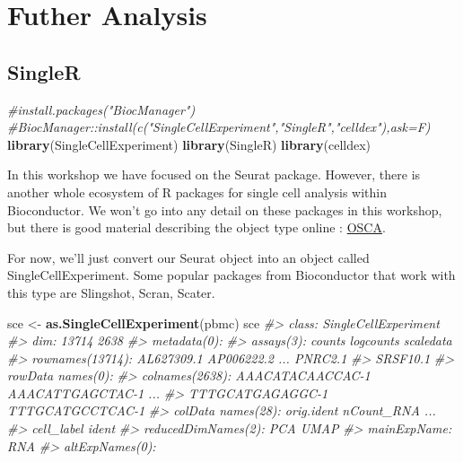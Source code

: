 \documentclass[
]{book}
\newenvironment{Shaded}{\begin{snugshade}}{\end{snugshade}}
\newcommand{\CommentTok}[1]{\textcolor[rgb]{0.56,0.35,0.01}{\textit{#1}}}
\newcommand{\FunctionTok}[1]{\textcolor[rgb]{0.13,0.29,0.53}{\textbf{#1}}}
\newcommand{\NormalTok}[1]{#1}
\newcommand{\OtherTok}[1]{\textcolor[rgb]{0.56,0.35,0.01}{#1}}
\begin{document}
\part{Futher Analysis}\label{part-futher-analysis}

\chapter{SingleR}\label{singler}

\begin{Shaded}
\begin{Highlighting}[]
\CommentTok{\#install.packages("BiocManager")}
\CommentTok{\#BiocManager::install(c("SingleCellExperiment","SingleR","celldex"),ask=F)}
\FunctionTok{library}\NormalTok{(SingleCellExperiment)}
\FunctionTok{library}\NormalTok{(SingleR)}
\FunctionTok{library}\NormalTok{(celldex)}
\end{Highlighting}
\end{Shaded}

In this workshop we have focused on the Seurat package. However, there is another whole ecosystem of R packages for single cell analysis within Bioconductor. We won't go into any detail on these packages in this workshop, but there is good material describing the object type online : \href{https://robertamezquita.github.io/orchestratingSingleCellAnalysis/data-infrastructure.html}{OSCA}.

For now, we'll just convert our Seurat object into an object called SingleCellExperiment. Some popular packages from Bioconductor that work with this type are Slingshot, Scran, Scater.

\begin{Shaded}
\begin{Highlighting}[]
\NormalTok{sce }\OtherTok{\textless{}{-}} \FunctionTok{as.SingleCellExperiment}\NormalTok{(pbmc)}
\NormalTok{sce}
\CommentTok{\#\textgreater{} class: SingleCellExperiment }
\CommentTok{\#\textgreater{} dim: 13714 2638 }
\CommentTok{\#\textgreater{} metadata(0):}
\CommentTok{\#\textgreater{} assays(3): counts logcounts scaledata}
\CommentTok{\#\textgreater{} rownames(13714): AL627309.1 AP006222.2 ... PNRC2.1}
\CommentTok{\#\textgreater{}   SRSF10.1}
\CommentTok{\#\textgreater{} rowData names(0):}
\CommentTok{\#\textgreater{} colnames(2638): AAACATACAACCAC{-}1 AAACATTGAGCTAC{-}1 ...}
\CommentTok{\#\textgreater{}   TTTGCATGAGAGGC{-}1 TTTGCATGCCTCAC{-}1}
\CommentTok{\#\textgreater{} colData names(28): orig.ident nCount\_RNA ...}
\CommentTok{\#\textgreater{}   cell\_label ident}
\CommentTok{\#\textgreater{} reducedDimNames(2): PCA UMAP}
\CommentTok{\#\textgreater{} mainExpName: RNA}
\CommentTok{\#\textgreater{} altExpNames(0):}
\end{Highlighting}
\end{Shaded}
\end{document}

